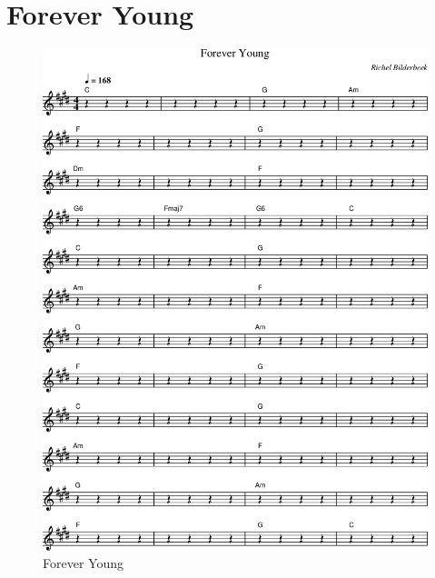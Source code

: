 \chapter{Forever Young}

%

\begin{figure}[!htbp]
  \includegraphics[width=\textwidth,height=\textheight,keepaspectratio]{../songs/xx_forever_young.png}
  \caption{Forever Young}
  \label{fig:xx_forever_young}
\end{figure}
